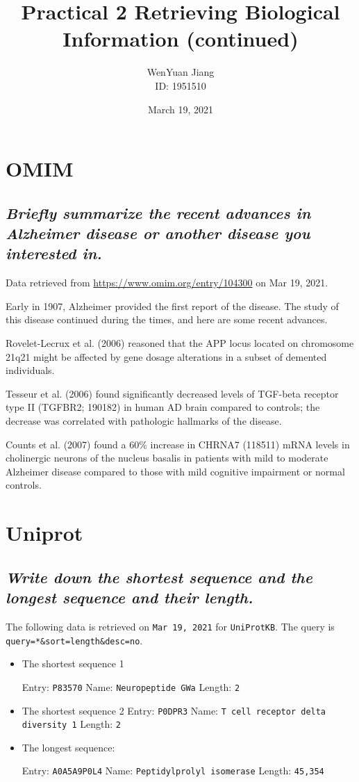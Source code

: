 \documentclass[en,black,11pt,normal]{elegantnote}
\title{Practical 2 Retrieving Biological Information (continued)}
\author{WenYuan Jiang\\ID: 1951510}
\institute{School of Life Science, Tongji University}
\date{March 19, 2021}
\newcommand{\upcite}[1]{\textsuperscript{\textsuperscript{\cite{#1}}}}
\begin{document}
\maketitle


\section{OMIM}
\subsection{\textit{Briefly summarize the recent advances in Alzheimer disease or another disease you interested in.}}
Data retrieved from \url{https://www.omim.org/entry/104300} on Mar 19, 2021.

Early in 1907, Alzheimer provided the first report of the disease. 
The study of this disease continued during the times, and here are some recent advances.

Rovelet-Lecrux et al. (2006) reasoned that the APP locus located on chromosome 21q21 might be affected by gene dosage alterations in a subset of demented individuals.

Tesseur et al. (2006) found significantly decreased levels of TGF-beta receptor type II (TGFBR2; 190182) in human AD brain compared to controls; the decrease was correlated with pathologic hallmarks of the disease.

Counts et al. (2007) found a 60\% increase in CHRNA7 (118511) mRNA levels in cholinergic neurons of the nucleus basalis in patients with mild to moderate Alzheimer disease compared to those with mild cognitive impairment or normal controls.
\section{Uniprot}
\subsection{\textit{Write down the shortest sequence and the longest sequence and their length.}}
The following data is retrieved on \texttt{Mar 19, 2021} for \texttt{UniProtKB}.\upcite{uniprot2021uniprot}
The query is \lstinline{query=*&sort=length&desc=no}.
\begin{itemize}
    \item The shortest sequence 1
    
    \subitem Entry: \texttt{P83570}
    \subitem Name: \texttt{Neuropeptide GWa}
    \subitem Length: \texttt{2}
    
    \item The shortest sequence 2
    \subitem Entry: \texttt{P0DPR3}
    \subitem Name: \texttt{T cell receptor delta diversity 1}
    \subitem Length: \texttt{2}

    \item The longest sequence:
    
    \subitem Entry: \texttt{A0A5A9P0L4}
    \subitem Name: \texttt{Peptidylprolyl isomerase}
    \subitem Length: \texttt{45,354}
\end{itemize}
\end{document}
